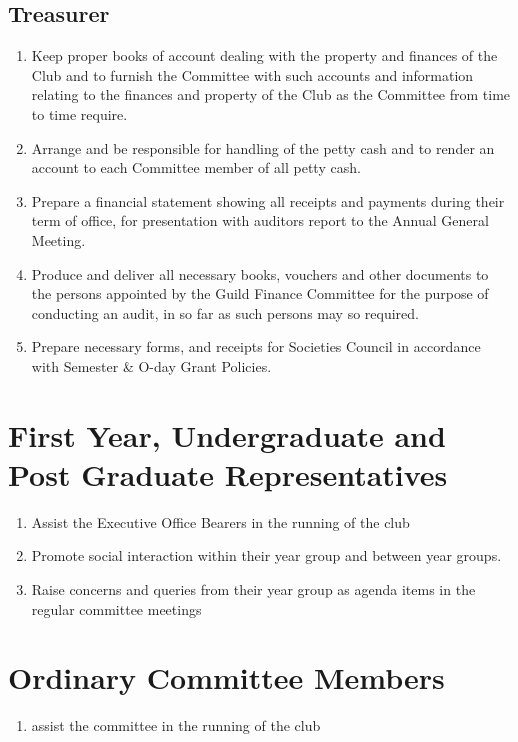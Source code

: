 \documentclass[10pt,a4paper]{report}
\begin{document}
		\subsection{Treasurer}
			\begin{enumerate}[label=\alph*]
				\item Keep proper books of account dealing with the property and finances of the Club and to furnish the Committee with such accounts and information relating to the finances and property of the Club as the Committee from time to time require.
				\item Arrange and be responsible for handling of the petty cash and to render an account to each Committee member of all petty cash.
				\item Prepare a financial statement showing all receipts and payments during their term of office, for presentation with auditors report to the Annual General Meeting.
				\item Produce and deliver all necessary books, vouchers and other documents to the persons appointed by the Guild Finance Committee for the purpose of conducting an audit, in so far as such persons may so required.
				\item Prepare necessary forms, and receipts for Societies Council in accordance with Semester \& O-day Grant Policies. 
			\end{enumerate}
		\section{First Year, Undergraduate and Post Graduate Representatives}
			\begin{enumerate}[label=\alph*]
				\item Assist the Executive Office Bearers in the running of the club
				\item Promote social interaction within their year group and between year groups.
				\item Raise concerns and queries from their year group as agenda items in the regular committee meetings
			\end{enumerate}
		\section{Ordinary Committee Members}
			\begin{enumerate}[label=\alph*]
				\item assist the committee in the running of the club
			\end{enumerate}
		
\end{document}
